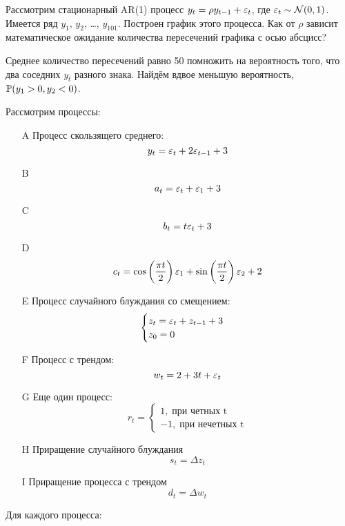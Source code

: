 \begin{problem}
Рассмотрим стационарный AR(1) процесс $y_t=\rho y_{t-1} + \e_t$, где $\e_t \sim \cN(0,1)$. 
Имеется ряд $y_1$, $y_2$, \ldots, $y_{101}$. Построен график этого процесса. 
Как от $\rho$ зависит математическое ожидание количества пересечений графика с осью абсцисс?


\begin{sol}
Среднее количество пересечений равно 50 помножить на вероятность того, что два соседних $y_t$ разного знака. 
Найдём вдвое меньшую вероятность, $\P(y_1>0, y_2 <0)$.
\end{sol}
\end{problem}



\begin{problem}
Рассмотрим процессы:

\begin{enumerate}
\item[A] Процесс скользящего среднего:
\[
y_t=\e_t+2\e_{t-1}+3
\]

\item[B]
\[
a_t=\e_t+\e_1 + 3
\]

\item[C]
\[
b_t=t\e_t + 3
\]

\item[D]
\[
c_t=\cos\left(\frac{\pi t}{2}\right)\e_1 + \sin\left(\frac{\pi t}{2}\right)\e_2 + 2
\]

\item[E] Процесс случайного блуждания со смещением:
\[
\begin{cases}
z_t=\e_t+z_{t-1}+3 \\
z_0=0
\end{cases}
\]

\item[F] Процесс с трендом:
\[
w_t=2+3t+\e_t
\]

\item[G] Еще один процесс:
\[
r_t=\begin{cases}
1, \; \text{при четных t} \\
-1, \; \text{при нечетных t}
\end{cases}
\]

\item[H] Приращение случайного блуждания
\[
s_t=\Delta z_t
\]

\item[I] Приращение процесса с трендом
\[
d_t=\Delta w_t
\]
\end{enumerate}

Для каждого процесса:


\end{problem}
